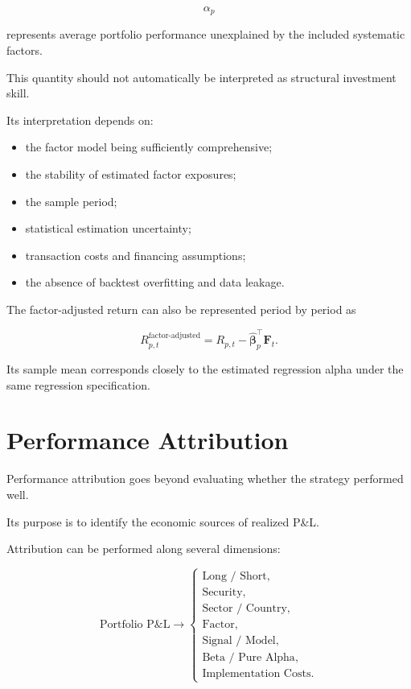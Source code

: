 \documentclass[11pt,a4paper]{article}
\begin{document}
\begin{equation}
\boxed{
\alpha_p
}
\end{equation}

represents average portfolio performance unexplained by the included systematic
factors.

This quantity should not automatically be interpreted as structural investment
skill.

Its interpretation depends on:

\begin{itemize}
    \item the factor model being sufficiently comprehensive;
    \item the stability of estimated factor exposures;
    \item the sample period;
    \item statistical estimation uncertainty;
    \item transaction costs and financing assumptions;
    \item the absence of backtest overfitting and data leakage.
\end{itemize}

The factor-adjusted return can also be represented period by period as

\begin{equation}
\boxed{
R_{p,t}^{\mathrm{factor\text{-}adjusted}}
=
R_{p,t}
-
\widehat{\boldsymbol{\beta}}_p^\top
\mathbf{F}_t.
}
\end{equation}

Its sample mean corresponds closely to the estimated regression alpha under the
same regression specification.


\section{Performance Attribution}
\label{sec:performance_attribution}

Performance attribution goes beyond evaluating whether the strategy performed
well.

Its purpose is to identify the economic sources of realized P\&L.

Attribution can be performed along several dimensions:

\begin{equation}
\boxed{
\text{Portfolio P\&L}
\rightarrow
\begin{cases}
\text{Long / Short},\\
\text{Security},\\
\text{Sector / Country},\\
\text{Factor},\\
\text{Signal / Model},\\
\text{Beta / Pure Alpha},\\
\text{Implementation Costs}.
\end{cases}
}
\end{equation}
\end{document}
